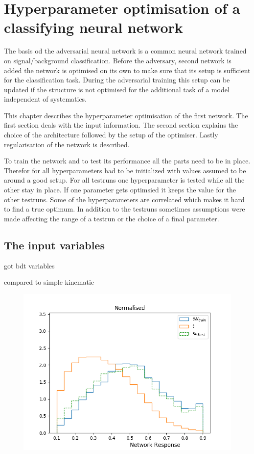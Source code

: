 \chapter{Hyperparameter optimisation of a classifying neural network}
\label{sec:simpleNN}

The basis od the adversarial neural network is a common neural network trained on signal/background classification.
Before the adversary, second network is added the network is optimised on its own to make sure that its setup is sufficient for the classification task.
During the adversarial training this setup can be updated if the structure is not optimised for the additional task of a model independent of systematics.

This chapter describes the hyperparameter optimisation of the first network. The first section deals with the input information.
The second section explains the choice of the architecture followed by the setup of the optimiser.
Lastly regularisation of the network is described.

To train the network and to test its performance all the parts need to be in place. Therefor for all hyperparameters had to be initialized with values assumed to be around a good setup. For all testruns one hyperparameter is tested while all the other stay in place. If one parameter gets optimsied it keeps the value for the other testruns. Some of the hyperparameters are correlated which makes it hard to find a true optimum. In addition to the testruns sometimes assumptions were made affecting the range of a testrun or the choice of a final parameter. 

\section{The input variables}

got bdt variables

compared to simple kinematic

\begin{figure}
	\centering
	\includegraphics[width=\figwidth]{figures_simpleNN/test_simple.png}
\end{figure}



